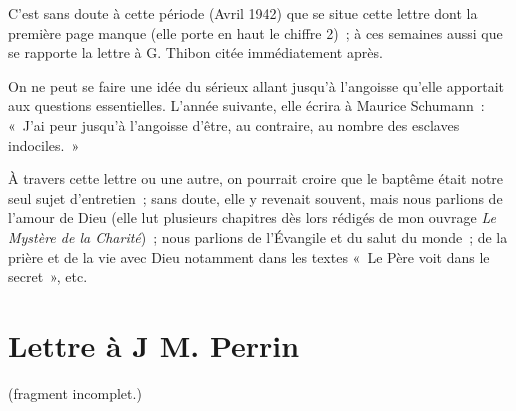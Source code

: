 \documentclass[french,twoside]{book} %
\newcommand\chapteropen{} %
\newcommand\chaptercont{} %
\begin{document}
\chaptercont
\noindent C'est sans doute à cette période (Avril 1942) que se situe cette lettre dont la première page manque (elle porte en haut le chiffre 2) ; à ces semaines aussi que se rapporte la lettre à G. Thibon citée immédiatement après.\par
On ne peut se faire une idée du sérieux allant jusqu'à l'angoisse qu'elle apportait aux questions essentielles. L'année suivante, elle écrira à Maurice Schumann : « J'ai peur jusqu'à l'angoisse d'être, au contraire, au nombre des esclaves indociles. »\par
À travers cette lettre ou une autre, on pourrait croire que le baptême était notre seul sujet d'entretien ; sans doute, elle y revenait souvent, mais nous parlions de l'amour de Dieu (elle lut plusieurs chapitres dès lors rédigés de mon ouvrage {\itshape Le Mystère de la Charité}) ; nous parlions de l'Évangile et du salut du monde ; de la prière et de la vie avec Dieu notamment dans les textes « Le Père voit dans le secret », etc. \par

\chapteropen
\chapter[{Lettre à J M. Perrin}]{Lettre à J M. Perrin}

\chaptercont

\begin{center}
\noindent \centerline{(fragment incomplet.)}\par
\end{center}


\begin{center}
\noindent \centerline{}\par
\end{center}
\end{document}
